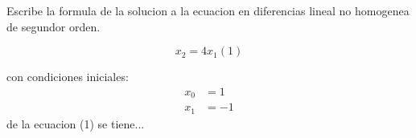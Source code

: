 \documentclass{article}
\begin{document}
Escribe la formula de la solucion a la ecuacion en diferencias lineal no homogenea de segundor orden.
\begin{center}
 $$ x_2=4x_1(1)$$
\end{center}
con condiciones iniciales:
\begin{align*}
  x_0&=1\\
  x_1&=-1
\end{align*}
de la ecuacion (1) se tiene...
\end{document}
